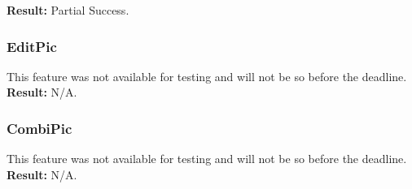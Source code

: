 \textbf{Result:} Partial Success.

\subsubsection*{EditPic}
This feature was not available for testing and will not be so before the deadline.\\

\textbf{Result:} N/A.

\subsubsection*{CombiPic}
This feature was not available for testing and will not be so before the deadline.\\

\textbf{Result:} N/A.